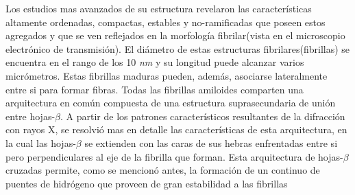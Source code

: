 Los estudios mas avanzados de su estructura revelaron las características altamente ordenadas, compactas, estables y no-ramificadas que poseen estos agregados y que se ven reflejados en
la morfología fibrilar(vista en el microscopio electrónico de transmisión).
El diámetro de estas estructuras fibrilares(fibrillas) se encuentra en el rango de los 10 \textit{nm} y su longitud puede alcanzar varios micrómetros. 
Estas fibrillas maduras pueden, además, asociarse lateralmente entre si para formar fibras.
Todas las fibrillas amiloides comparten una arquitectura en común compuesta de una estructura suprasecundaria de unión entre hojas-$\beta$.
A partir de los patrones característicos resultantes de la difracción con rayos X, se resolvió mas en detalle las características de esta arquitectura, en la cual 
las hojas-$\beta$ se extienden con las caras de sus hebras enfrentadas entre si pero perpendiculares al eje de la fibrilla que forman\cite{nelson2005structure}.  
Esta arquitectura de hojas-$\beta$ cruzadas permite, como se mencionó antes, la formación de un continuo de puentes de hidrógeno que proveen de gran estabilidad a las fibrillas 

